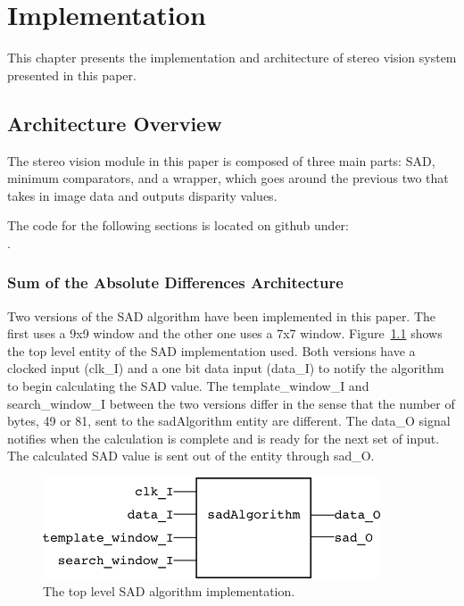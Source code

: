 \chapter{Implementation}
\label{sec:impl}

This chapter presents the implementation and architecture of stereo vision system presented in this paper.

\section{Architecture Overview}

The stereo vision module in this paper is composed of three main parts: SAD, minimum comparators, and a wrapper, which goes around the previous two that takes in image data and outputs disparity values.

The code for the following sections is located on github under:
\\.

\subsection{Sum of the Absolute Differences Architecture}

Two versions of the SAD algorithm have been implemented in this paper. The first uses a 9x9 window and the other one uses a 7x7 window. Figure~\ref{fig:sadAlg_rtl} shows the top level entity of the SAD implementation used. Both versions have a clocked input (clk\_I) and a one bit data input (data\_I) to notify the algorithm to begin calculating the SAD value. The template\_window\_I and search\_window\_I between the two versions differ in the sense that the number of bytes, 49 or 81, sent to the sadAlgorithm entity are different. The data\_O signal notifies when the calculation is complete and is ready for the next set of input. The calculated SAD value is sent out of the entity through sad\_O.

\begin{figure}[h]
	\begin{center}
		\includegraphics[width=100mm]{figures/sadAlgorithm_rtl.png}
		\captionfonts
		\caption{The top level SAD algorithm implementation.}
		\label{fig:sadAlg_rtl}
	\end{center}
\end{figure}

